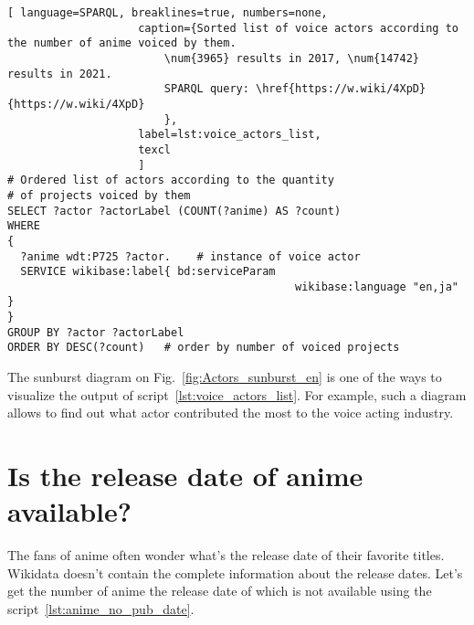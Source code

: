 \begin{lstlisting}[ language=SPARQL, breaklines=true, numbers=none,
                    caption={Sorted list of voice actors according to the number of anime voiced by them.
                        \num{3965} results in 2017, \num{14742} results in 2021.
                        SPARQL query: \href{https://w.wiki/4XpD}{https://w.wiki/4XpD}
                        },
                    label=lst:voice_actors_list,
                    texcl 
                    ]
# Ordered list of actors according to the quantity
# of projects voiced by them
SELECT ?actor ?actorLabel (COUNT(?anime) AS ?count)
WHERE
{
  ?anime wdt:P725 ?actor.	 # instance of voice actor
  SERVICE wikibase:label{ bd:serviceParam
			  								wikibase:language "en,ja" }
}
GROUP BY ?actor	?actorLabel
ORDER BY DESC(?count)	# order by number of voiced projects
\end{lstlisting}%

\begin{figure*}

    \setlength{\fboxsep}{0pt}%
    \setlength{\fboxrule}{1pt}%
	\caption[Sunburst diagram of number of roles voiced by different actors, 2021.]{Sunburst diagram of number of roles voiced by different actors, 2021. The diagram is constructed using the output of script~\ref{lst:voice_actors_list} and \href{https:\\app.rawgraphs.io}{Rawgraphs} service.}%
    \label{fig:Actors_sunburst_en}%
\end{figure*}

The sunburst diagram on Fig.~\ref{fig:Actors_sunburst_en} is one of the ways to visualize the output of script~\ref{lst:voice_actors_list}. For example, such a diagram allows to find out what actor contributed the most to the voice acting industry.

\section{Is the release date of anime available?}

The fans of anime often wonder what's the release date of their favorite titles. Wikidata doesn't contain the complete information about the release dates. Let's get the number of anime the release date of which is not available using the script~\ref{lst:anime_no_pub_date}.

